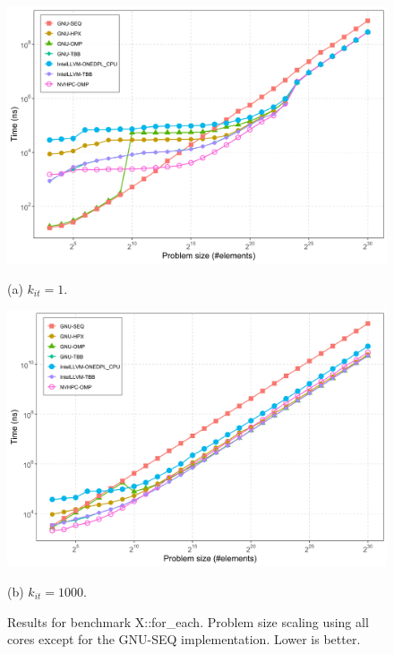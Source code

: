 \documentclass[sigconf]{acmart}
\begin{document}
\begin{figure}[H]
      \centering
      \begin{minipage}[t]{0.48\linewidth}
            \centering
            \includegraphics[width=\linewidth]{figures/problemSize_time-for_each-k1.png}
            \caption*{(a) $k_{it} = 1$.}
      \end{minipage}
      \hfill
      \begin{minipage}[t]{0.48\linewidth}
            \centering
            \includegraphics[width=\linewidth]{figures/problemSize_time-for_each-k1000.png}
            \caption*{(b) $k_{it} = 1000$.}
      \end{minipage}
      \caption{Results for benchmark X::for\_each. Problem size scaling using all
            cores except for the GNU-SEQ implementation. Lower is better.}
      \label{fig:problemSize_time-for_each}
\end{figure}
\end{document}
